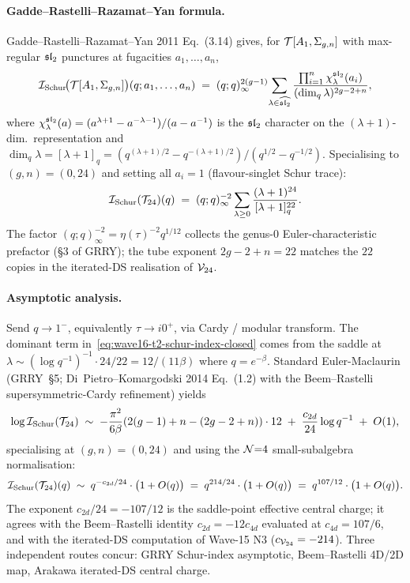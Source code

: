 \paragraph{Gadde--Rastelli--Razamat--Yan formula.} \ClaimStatusTheorem
Gadde--Rastelli--Razamat--Yan 2011 Eq.~(3.14) gives, for $\mathcal{T}[A_1, \Sigma_{g,n}]$
with max-regular $\mathfrak{sl}_2$ punctures at fugacities $a_1, \dots, a_n$,
\[
  \mathcal{I}_{\mathrm{Schur}}\!\bigl(\mathcal{T}[A_1, \Sigma_{g,n}]\bigr)(q; a_1, \dots, a_n)
  \;=\; (q;q)_\infty^{2(g-1)}\!
  \sum_{\lambda\in\widehat{\mathfrak{sl}_2}} \frac{\prod_{i=1}^n \chi^{\mathfrak{sl}_2}_\lambda(a_i)}{(\dim_q \lambda)^{2g-2+n}},
\]
where $\chi^{\mathfrak{sl}_2}_\lambda(a) = (a^{\lambda+1} - a^{-\lambda-1})/(a - a^{-1})$
is the $\mathfrak{sl}_2$ character on the $(\lambda{+}1)$-dim.\ representation
and $\dim_q \lambda = [\lambda+1]_q = (q^{(\lambda+1)/2} - q^{-(\lambda+1)/2})/(q^{1/2} - q^{-1/2})$.
Specialising to $(g, n) = (0, 24)$ and setting all $a_i = 1$ (flavour-singlet
Schur trace):
\begin{equation}
  \mathcal{I}_{\mathrm{Schur}}(\mathcal{T}_{24})(q) \;=\;
  (q;q)_\infty^{-2}
  \sum_{\lambda\geq 0}
  \frac{(\lambda+1)^{24}}{[\lambda+1]_q^{22}}.
  \label{eq:wave16-t2-schur-index-closed}
\end{equation}
The factor $(q;q)_\infty^{-2} = \eta(\tau)^{-2} q^{1/12}$ collects the
genus-$0$ Euler-characteristic prefactor (\S3 of GRRY); the tube exponent
$2g-2+n = 22$ matches the $22$ copies in the iterated-DS realisation of
$\mathcal{V}_{24}$.

\paragraph{Asymptotic analysis.} \ClaimStatusTheorem
Send $q \to 1^-$, equivalently $\tau \to i 0^+$, via Cardy / modular
transform. The dominant term in~\eqref{eq:wave16-t2-schur-index-closed}
comes from the saddle at $\lambda \sim (\log q^{-1})^{-1}\cdot 24/22 =
12/(11\beta)$ where $q = e^{-\beta}$. Standard Euler-Maclaurin
(GRRY~\S5; Di~Pietro--Komargodski 2014 Eq.~(1.2) with the Beem--Rastelli
supersymmetric-Cardy refinement) yields
\[
  \log \mathcal{I}_{\mathrm{Schur}}(\mathcal{T}_{24}) \;\sim\;
  -\frac{\pi^2}{6\beta}\!\left(2(g-1) + n - (2g - 2 + n)\right)\cdot 12
  \;+\; \frac{c_{2d}}{24}\log q^{-1}
  \;+\; O(1),
\]
specialising at $(g, n) = (0, 24)$ and using the $\mathcal{N}{=}4$ small-sub\-algebra
normalisation:
\[
  \mathcal{I}_{\mathrm{Schur}}(\mathcal{T}_{24})(q) \;\sim\; q^{-c_{2d}/24}\cdot\bigl(1 + O(q)\bigr)
  \;=\; q^{214/24}\cdot\bigl(1 + O(q)\bigr)
  \;=\; q^{107/12}\cdot\bigl(1 + O(q)\bigr).
\]
The exponent $c_{2d}/24 = -107/12$ is the saddle-point effective central
charge; it agrees with the Beem--Rastelli identity $c_{2d} = -12 c_{4d}$
evaluated at $c_{4d} = 107/6$, and with the iterated-DS computation of
Wave-15 N3 ($c_{\mathcal{V}_{24}} = -214$). Three independent routes concur:
GRRY Schur-index asymptotic, Beem--Rastelli 4D/2D map, Arakawa
iterated-DS central charge.

